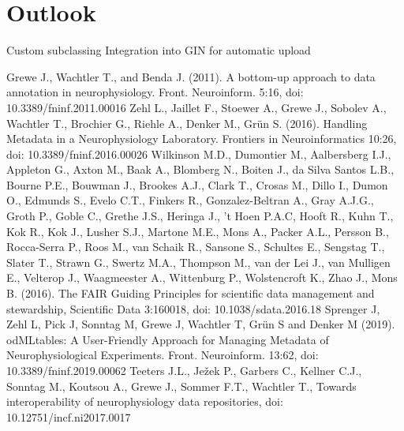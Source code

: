 \documentclass{article}
\begin{document}
\section{Outlook}
Custom subclassing
Integration into GIN for automatic upload

\begin{thebibliography}{}
Grewe J., Wachtler T., and Benda J. (2011). A bottom-up approach to data annotation in neurophysiology. Front. Neuroinform. 5:16, doi: 10.3389/fninf.2011.00016
Zehl L., Jaillet F., Stoewer A., Grewe J., Sobolev A., Wachtler T., Brochier G., Riehle A., Denker M., Grün S. (2016). Handling Metadata in a Neurophysiology Laboratory. Frontiers in Neuroinformatics 10:26, doi: 10.3389/fninf.2016.00026
Wilkinson M.D., Dumontier M., Aalbersberg I.J., Appleton G., Axton M., Baak A., Blomberg N., Boiten J., da Silva Santos L.B., Bourne P.E., Bouwman J., Brookes A.J., Clark T., Crosas M., Dillo I., Dumon O., Edmunds S., Evelo C.T., Finkers R., Gonzalez-Beltran A., Gray A.J.G., Groth P., Goble C., Grethe J.S., Heringa J., ’t Hoen P.A.C, Hooft R., Kuhn T., Kok R., Kok J., Lusher S.J., Martone M.E., Mons A., Packer A.L., Persson B., Rocca-Serra P., Roos M., van Schaik R., Sansone S., Schultes E., Sengstag T., Slater T., Strawn G., Swertz M.A., Thompson M., van der Lei J., van Mulligen E., Velterop J., Waagmeester A., Wittenburg P., Wolstencroft K., Zhao J., Mons B. (2016). The FAIR Guiding Principles for scientific data management and stewardship, Scientific Data 3:160018, doi: 10.1038/sdata.2016.18
Sprenger J, Zehl L, Pick J, Sonntag M, Grewe J, Wachtler T, Grün S and Denker M (2019). odMLtables: A User-Friendly Approach for Managing Metadata of Neurophysiological Experiments. Front. Neuroinform. 13:62, doi: 10.3389/fninf.2019.00062
Teeters J.L., Ježek P., Garbers C., Kellner C.J., Sonntag M., Koutsou A., Grewe J., Sommer F.T., Wachtler T., Towards interoperability of neurophysiology data repositories, doi: 10.12751/incf.ni2017.0017
\end{thebibliography}
\end{document}
